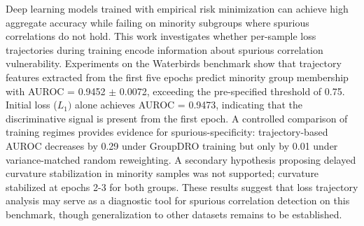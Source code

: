 
Deep learning models trained with empirical risk minimization can achieve high aggregate accuracy while failing on minority subgroups where spurious correlations do not hold. This work investigates whether per-sample loss trajectories during training encode information about spurious correlation vulnerability. Experiments on the Waterbirds benchmark show that trajectory features extracted from the first five epochs predict minority group membership with AUROC = 0.9452 $\pm$ 0.0072, exceeding the pre-specified threshold of 0.75. Initial loss ($L_{1})$ alone achieves AUROC = 0.9473, indicating that the discriminative signal is present from the first epoch. A controlled comparison of training regimes provides evidence for spurious-specificity: trajectory-based AUROC decreases by 0.29 under GroupDRO training but only by 0.01 under variance-matched random reweighting. A secondary hypothesis proposing delayed curvature stabilization in minority samples was not supported; curvature stabilized at epochs 2-3 for both groups. These results suggest that loss trajectory analysis may serve as a diagnostic tool for spurious correlation detection on this benchmark, though generalization to other datasets remains to be established.
